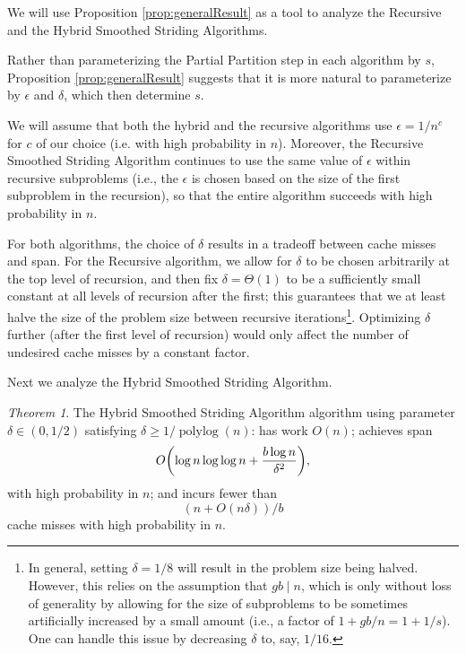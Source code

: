 \documentclass[sigplan, 10pt, nonacm]{acmart}
\DeclarePairedDelimiter{\paren}{(}{)}
\newcommand{\polylog}{\operatorname{polylog}}
\theoremstyle{remark}
\newtheorem{theorem}{Theorem}[section]
\theoremstyle{remark}
\begin{document}
We will use Proposition \ref{prop:generalResult} as a tool to analyze the Recursive and the Hybrid Smoothed Striding Algorithms.

Rather than parameterizing the Partial Partition step in each algorithm by $s$, Proposition \ref{prop:generalResult} suggests that it is more natural to parameterize by $\epsilon$ and $\delta$, which then determine $s$.

We will assume that both the hybrid and the recursive algorithms use $\epsilon = 1/n^c$ for $c$ of our choice (i.e. with high probability in $n$). Moreover, the Recursive Smoothed Striding Algorithm continues to use the same value of $\epsilon$ within recursive subproblems (i.e., the $\epsilon$ is chosen based on the size of the first subproblem in the recursion), so that the entire algorithm succeeds with high probability in $n$.

For both algorithms, the choice of $\delta$ results in a tradeoff between cache misses and span. For the Recursive algorithm, we allow for $\delta$ to be chosen arbitrarily at the top level of recursion, and then fix $\delta  = \Theta(1)$ to be a sufficiently small constant at all levels of recursion after the first; this guarantees that we at least halve the size of the problem size between recursive iterations\footnote{In general, setting $\delta = 1/8$ will result in the problem size being halved. However, this relies on the assumption that $gb \mid n$, which is only without loss of generality by allowing for the size of subproblems to be sometimes artificially increased by a small amount (i.e., a factor of $1 + gb / n = 1 + 1/s$). One can handle this issue by decreasing $\delta$ to, say, $1/16$.}. Optimizing $\delta$ further (after the first level of recursion) would only affect the number of undesired cache misses by a constant factor.




Next we analyze the Hybrid Smoothed Striding Algorithm.
\begin{theorem}
	\label{thm:fullPartition}
	The Hybrid Smoothed Striding Algorithm algorithm using parameter $\delta\in(0,1/2)$ satisfying $\delta \ge 1/\polylog(n)$: has work $O(n)$; achieves span
        $$O\paren*{\log n \log\log n +\frac{b\log n}{\delta^2}},$$
with high probability in $n$; and incurs fewer than 
$$(n+O(n\delta))/b$$
cache misses with high probability in $n$.
\end{theorem}
\end{document}
